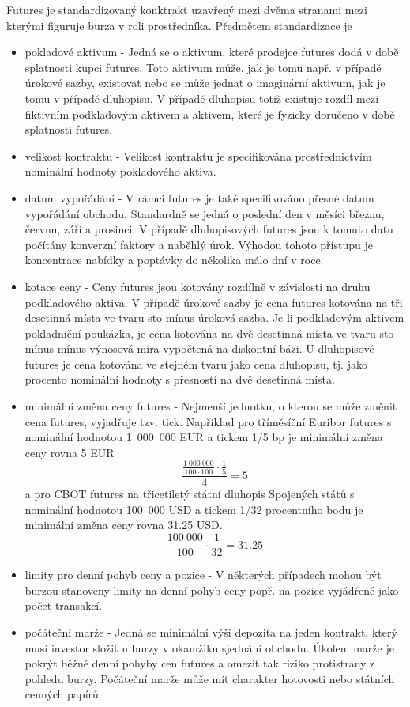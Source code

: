\documentclass[a4paper]{book}
\begin{document}
Futures je standardizovaný konktrakt uzavřený mezi dvěma stranami mezi kterými figuruje burza v roli prostředníka. Předmětem standardizace je
\begin{itemize}
\item pokladové aktivum - Jedná se o aktivum, které prodejce futures dodá v době splatnosti kupci futures. Toto aktivum může, jak je tomu např. v případě úrokové sazby, existovat nebo se může jednat o imaginární aktivum, jak je tomu v případě dluhopisu. V případě dluhopisu totiž existuje rozdíl mezi fiktivním podkladovým aktivem a aktivem, které je fyzicky doručeno v době splatnosti futures.
\item velikost kontraktu - Velikost kontraktu je specifikována prostřednictvím nominální hodnoty pokladového aktiva.
\item datum vypořádání - V rámci futures je také specifikováno přesné datum vypořádání obchodu. Standardně se jedná o poslední den v měsíci březnu, červnu, září a prosinci. V případě dluhopisových futures jsou k tomuto datu počítány konverzní faktory a naběhlý úrok. Výhodou tohoto přístupu je koncentrace nabídky a poptávky do několika málo dní v roce.
\item kotace ceny - Ceny futures jsou kotovány rozdílně v závislosti na druhu podkladového aktiva. V případě úrokové sazby je cena futures kotována na tři desetinná místa ve tvaru sto mínus úroková sazba. Je-li podkladovým aktivem pokladniční poukázka, je cena kotována na dvě desetinná místa ve tvaru sto mínus mínus výnosová míra vypočtená na diskontní bázi. U dluhopisové futures je cena kotována ve stejném tvaru jako cena dluhopisu, tj. jako procento nominální hodnoty s přesností na dvě desetinná místa.
\item minimální změna ceny futures - Nejmenší jednotku, o kterou se může změnit cena futures, vyjadřuje tzv. tick. Například pro tříměsíční Euribor futures s nominální hodnotou 1~000~000 EUR a tickem 1/5 bp je minimální změna ceny rovna 5 EUR
\begin{equation*}
\frac{\frac{1~000~000}{100 \cdot 100} \cdot \frac{1}{5}}{4} = 5
\end{equation*}
a pro CBOT futures na třicetiletý státní dluhopis Spojených států s nominální hodnotou 100~000 USD a tickem 1/32 procentního bodu je minimální změna ceny rovna 31.25 USD.
\begin{equation*}
\frac{100~000}{100} \cdot \frac{1}{32} = 31.25 
\end{equation*}
\item limity pro denní pohyb ceny a pozice - V některých případech mohou být burzou stanoveny limity na denní pohyb ceny popř. na pozice vyjádřené jako počet transakcí.
\item počáteční marže - Jedná se minimální výši depozita na jeden kontrakt, který musí investor složit u burzy v okamžiku sjednání obchodu. Úkolem marže je pokrýt běžné denní pohyby cen futures a omezit tak riziko protistrany z pohledu burzy. Počáteční marže může mít charakter hotovosti nebo státních cenných papírů.
\end{itemize}
\end{document}
